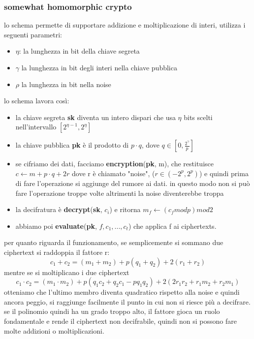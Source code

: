 \documentclass[12pt, oneside]{extbook} %
\begin{document}
\subsubsection{somewhat homomorphic crypto}
lo schema permette di supportare addizione e moltiplicazione di interi, utilizza i seguenti parametri:
\begin{itemize}
	\item $\eta$: la lunghezza in bit della chiave segreta
	\item $\gamma$ la lunghezza in bit degli interi nella chiave pubblica
	\item $\rho$ la lunghezza in bit nella noise
\end{itemize}
lo schema lavora così:
\begin{itemize}
	\item la chiave segreta \textbf{sk} diventa un intero dispari che usa $\eta$ bits scelti nell'intervallo $[2^{\eta -1}, 2^{\eta}]$
	\item la chiave pubblica \textbf{pk} è il prodotto di $p \cdot q$, dove $q \in [0, \frac{2^{\gamma}}{p}]$
	\item se cifriamo dei dati, facciamo \textbf{encryption}(\textbf{pk}, m), che restituisce $c \leftarrow m + p \cdot q + 2r$ dove r è chiamato "noise", ($r \in (-2^p, 2^p)$) e quindi prima di fare l'operazione si aggiunge del rumore ai dati. in questo modo non si può fare l'operazione troppe volte altrimenti la noise diventerebbe troppa
	\item la decifratura è \textbf{decrypt}(\textbf{sk}, $c_i$) e ritorna $m_f \leftarrow (c_f mod p)mod2$
	\item abbiamo poi \textbf{evaluate}(\textbf{pk}, $f, c_1,..., c_t$) che applica f ai ciphertexts.
\end{itemize}
per quanto riguarda il funzionamento, se semplicemente si sommano due ciphertext si raddoppia il fattore r:
\begin{equation}
	c_1 + c_2 = (m_1 + m_2) +p(q_1 + q_2) +2(r_1 + r_2)
\end{equation}
mentre se si moltiplicano i due ciphertext 
\begin{equation}
	c_1 \cdot c_2 = (m_1\cdot m_2) +p(q_1c_2 + q_2c_1 -pq_1q_2) +2(2r_1r_2 + r_1m_2 + r_2m_1)
\end{equation}
otteniamo che l'ultimo membro diventa quadratico rispetto alla noise e quindi ancora peggio, si raggiunge facilmente il punto in cui non si riesce più a decifrare.\\se il polinomio quindi ha un grado troppo alto, il fattore gioca un ruolo fondamentale e rende il ciphertext non decifrabile, quindi non si possono fare molte addizioni o moltiplicazioni.
\end{document}
